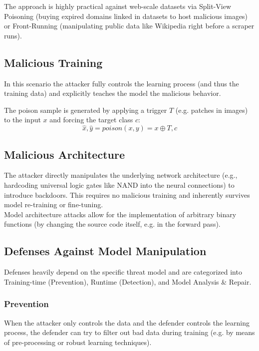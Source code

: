The approach is highly practical against web-scale datasets via Split-View Poisoning (buying expired domains linked in datasets to host malicious images) or Front-Running (manipulating public data like Wikipedia right before a scraper runs).


\subsection{Malicious Training}
In this scenario the attacker fully controls the learning process (and thus the training data) and explicitly teaches the model the malicious behavior.

The poison sample is generated by applying a trigger $T$ (e.g. patches in images) to the input $x$ and forcing the target class $c$: 
$$\hat{x},\hat{y}=poison(x,y)=x\oplus T,c$$ 


\subsection{Malicious Architecture}
The attacker directly manipulates the underlying network architecture (e.g., hardcoding universal logic gates like NAND into the neural connections) to introduce backdoors. This requires no malicious training and inherently survives model re-training or fine-tuning.\\
Model architecture attacks allow for the implementation of arbitrary binary functions (by changing the source code itself, e.g. in the forward pass).



\subsection{Defenses Against Model Manipulation}
Defenses heavily depend on the specific threat model and are categorized into Training-time (Prevention), Runtime (Detection), and Model Analysis \& Repair.

\subsubsection{Prevention}
When the attacker only controls the data and the defender controls the learning process, the defender can try to filter out bad data during training (e.g. by means of pre-processing or robust learning techniques).

